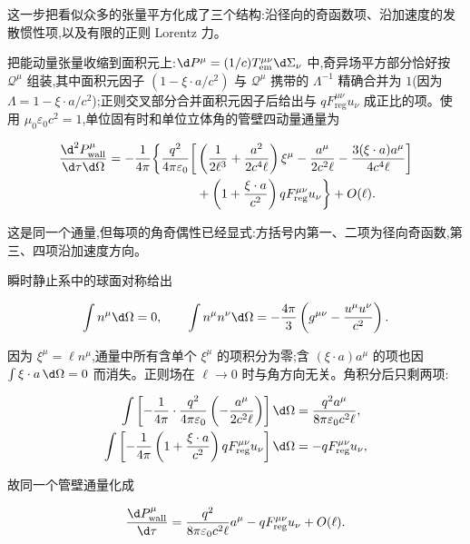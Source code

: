 这一步把看似众多的张量平方化成了三个结构:沿径向的奇函数项、沿加速度的发散惯性项,以及有限的正则 Lorentz 力。

把能动量张量收缩到面积元上:$\d P^\mu=(1/c)T_{\mathrm{em}}^{\mu\nu}\d\Sigma_\nu$ 中,奇异场平方部分恰好按 $\mathcal Q^\mu$ 组装,其中面积元因子 $(1-\xi\cdot a/c^2)$ 与 $\mathcal Q^\mu$ 携带的 $\Lambda^{-1}$ 精确合并为 $1$(因为 $\Lambda=1-\xi\cdot a/c^2$);正则交叉部分合并面积元因子后给出与 $qF_{\mathrm{reg}}^{\mu\nu}u_\nu$ 成正比的项。使用 $\mu_0\varepsilon_0c^2=1$,单位固有时和单位立体角的管壁四动量通量为

\begin{align*}
 {\d^2P_{\mathrm{wall}}^\mu\over\d\tau\d\Omega}
 =-{1\over4\pi}\bigg\{ {q^2\over4\pi\varepsilon_0}
 \bigg[{}
 &\left({1\over2\ell^3}
 +{a^2\over2c^4\ell}\right)\xi^\mu
 -{a^\mu\over2c^2\ell}
 -{3(\xi\cdot a)a^\mu\over4c^4\ell}
 \bigg]\\
 &+\left(1+{\xi\cdot a\over c^2}\right)
 qF_{\mathrm{reg}}^{\mu\nu}u_\nu
 \bigg\}+O(\ell).
\end{align*}

这是同一个通量,但每项的角奇偶性已经显式:方括号内第一、二项为径向奇函数,第三、四项沿加速度方向。

瞬时静止系中的球面对称给出

\begin{equation*}
 \int n^\mu\d\Omega=0,
 \qquad
 \int n^\mu n^\nu\d\Omega
 =-{4\pi\over3}
 \left(g^{\mu\nu}-{u^\mu u^\nu\over c^2}\right).
\end{equation*}

因为 $\xi^\mu=\ell n^\mu$,通量中所有含单个 $\xi^\mu$ 的项积分为零;含 $(\xi\cdot a)a^\mu$ 的项也因 $\int\xi\cdot a\,\d\Omega=0$ 而消失。正则场在 $\ell\to0$ 时与角方向无关。角积分后只剩两项:

\begin{align*}
 \int\left[-{1\over4\pi}\cdot{q^2\over4\pi\varepsilon_0}
 \left(-{a^\mu\over2c^2\ell}\right)\right]\d\Omega
 &={q^2a^\mu\over8\pi\varepsilon_0c^2\ell},\\
 \int\left[-{1\over4\pi}
 \left(1+{\xi\cdot a\over c^2}\right)
 qF_{\mathrm{reg}}^{\mu\nu}u_\nu\right]\d\Omega
 &=-qF_{\mathrm{reg}}^{\mu\nu}u_\nu,
\end{align*}

故同一个管壁通量化成

\begin{equation*}
 {\d P_{\mathrm{wall}}^\mu\over\d\tau}
 ={q^2\over8\pi\varepsilon_0c^2\ell}a^\mu
 -qF_{\mathrm{reg}}^{\mu\nu}u_\nu
 +O(\ell).
\end{equation*}

